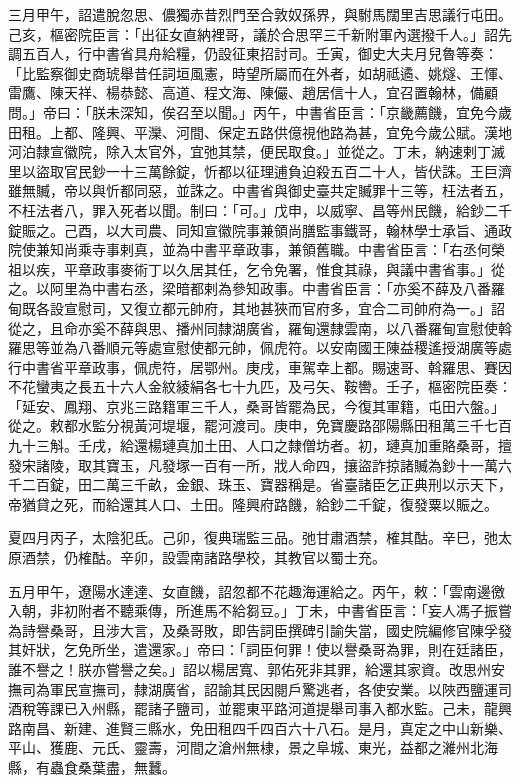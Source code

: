 \begin{pinyinscope}
 三月甲午，詔遣脫忽思、儂獨赤昔烈門至合敦奴孫界，與駙馬闊里吉思議行屯田。己亥，樞密院臣言：「出征女直納裡哥，議於合思罕三千新附軍內選撥千人。」詔先調五百人，行中書省具舟給糧，仍設征東招討司。壬寅，御史大夫月兒魯等奏：「比監察御史商琥舉昔任詞垣風憲，時望所屬而在外者，如胡祗遹、姚燧、王惲、雷鷹、陳天祥、楊恭懿、高道、程文海、陳儼、趙居信十人，宜召置翰林，備顧問。」帝曰：「朕未深知，俟召至以聞。」丙午，中書省臣言：「京畿薦饑，宜免今歲田租。上都、隆興、平灤、河間、保定五路供億視他路為甚，宜免今歲公賦。漢地河泊隸宣徽院，除入太官外，宜弛其禁，便民取食。」並從之。丁未，納速剌丁滅里以盜取官民鈔一十三萬餘錠，忻都以征理逋負迫殺五百二十人，皆伏誅。王巨濟雖無贓，帝以與忻都同惡，並誅之。中書省與御史臺共定贓罪十三等，枉法者五，不枉法者八，罪入死者以聞。制曰：「可。」戊申，以威寧、昌等州民饑，給鈔二千錠賑之。己酉，以大司農、同知宣徽院事兼領尚膳監事鐵哥，翰林學士承旨、通政院使兼知尚乘寺事剌真，並為中書平章政事，兼領舊職。中書省臣言：「右丞何榮祖以疾，平章政事麥術丁以久居其任，乞令免署，惟食其祿，與議中書省事。」從之。以阿里為中書右丞，梁暗都剌為參知政事。中書省臣言：「亦奚不薛及八番羅甸既各設宣慰司，又復立都元帥府，其地甚狹而官府多，宜合二司帥府為一。」詔從之，且命亦奚不薛與思、播州同隸湖廣省，羅甸還隸雲南，以八番羅甸宣慰使斡羅思等並為八番順元等處宣慰使都元帥，佩虎符。以安南國王陳益稷遙授湖廣等處行中書省平章政事，佩虎符，居鄂州。庚戌，車駕幸上都。賜速哥、斡羅思、賽因不花蠻夷之長五十六人金紋綾絹各七十九匹，及弓矢、鞍轡。壬子，樞密院臣奏：「延安、鳳翔、京兆三路籍軍三千人，桑哥皆罷為民，今復其軍籍，屯田六盤。」從之。敕都水監分視黃河堤堰，罷河渡司。庚申，免寶慶路邵陽縣田租萬三千七百九十三斛。壬戌，給還楊璉真加土田、人口之隸僧坊者。初，璉真加重賂桑哥，擅發宋諸陵，取其寶玉，凡發塚一百有一所，戕人命四，攘盜詐掠諸贓為鈔十一萬六千二百錠，田二萬三千畝，金銀、珠玉、寶器稱是。省臺諸臣乞正典刑以示天下，帝猶貸之死，而給還其人口、土田。隆興府路饑，給鈔二千錠，復發粟以賑之。



 夏四月丙子，太陰犯氐。己卯，復典瑞監三品。弛甘肅酒禁，榷其酤。辛巳，弛太原酒禁，仍榷酤。辛卯，設雲南諸路學校，其教官以蜀士充。



 五月甲午，遼陽水達達、女直饑，詔忽都不花趣海運給之。丙午，敕：「雲南邊徼入朝，非初附者不聽乘傳，所進馬不給芻豆。」丁未，中書省臣言：「妄人馮子振嘗為詩譽桑哥，且涉大言，及桑哥敗，即告詞臣撰碑引諭失當，國史院編修官陳孚發其奸狀，乞免所坐，遣還家。」帝曰：「詞臣何罪！使以譽桑哥為罪，則在廷諸臣，誰不譽之！朕亦嘗譽之矣。」詔以楊居寬、郭佑死非其罪，給還其家資。改思州安撫司為軍民宣撫司，隸湖廣省，詔諭其民因閱戶驚逃者，各使安業。以陜西鹽運司酒稅等課已入州縣，罷諸子鹽司，並罷東平路河道提舉司事入都水監。己未，龍興路南昌、新建、進賢三縣水，免田租四千四百六十八石。是月，真定之中山新樂、平山、獲鹿、元氏、靈壽，河間之滄州無棣，景之阜城、東光，益都之濰州北海縣，有蟲食桑葉盡，無蠶。




\end{pinyinscope}
